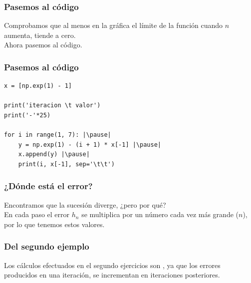 \documentclass[12pt]{beamer}
\begin{document}
\begin{frame}
\frametitle{Pasemos al código}
Comprobamos que al menos en la gráfica el límite de la función cuando $n$ aumenta, tiende a cero.
\\
\bigskip
\pause
Ahora pasemos al código.
\end{frame}
\begin{frame}[fragile]
\frametitle{Pasemos al código}
\begin{lstlisting}[caption=Código para el ejemplo 2]
x = [np.exp(1) - 1]

print('iteracion \t valor')
print('-'*25)

for i in range(1, 7): |\pause|
	y = np.exp(1) - (i + 1) * x[-1] |\pause|
	x.append(y) |\pause|
	print(i, x[-1], sep='\t\t')
\end{lstlisting}
\end{frame}
\begin{frame}
\frametitle{¿Dónde está el error?}
Encontramos que la sucesión diverge, ¿pero por qué?
\\
\bigskip
\pause
En cada paso el error $h_{n}$ se multiplica por un número cada vez más grande ($n$), por lo que tenemos estos valores.
\end{frame}
\begin{frame}
\frametitle{Del segundo ejemplo}
Los cálculos efectuados en el segundo ejercicios son , \pause ya que los errores producidos en una iteración, se incrementan en iteraciones posteriores.
\end{frame}
\end{document}
